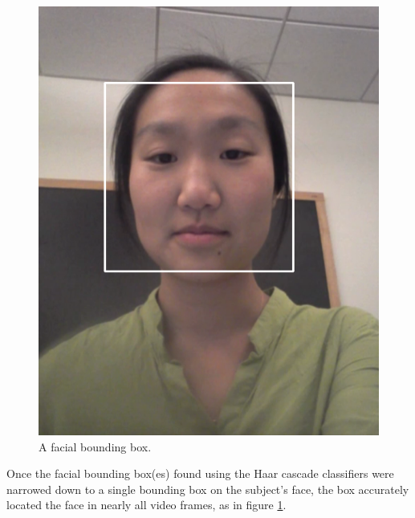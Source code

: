 \documentclass[10pt,twocolumn,letterpaper]{article}
\begin{document}
\begin{figure}
\begin{center}
	\includegraphics[scale=0.3]{figures/jane_bb}
\end{center}
\caption{A facial bounding box.}
\label{face_bb}
\end{figure}

Once the facial bounding box(es) found using the Haar cascade classifiers were narrowed down to a single bounding box on the subject's face, the box accurately located the face in nearly all video frames, as in figure \ref{face_bb}. 
\end{document}
